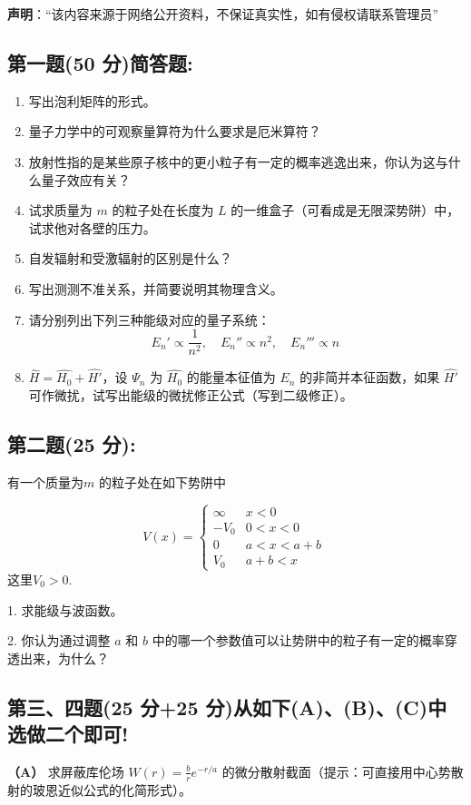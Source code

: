 
\textbf{声明}：“该内容来源于网络公开资料，不保证真实性，如有侵权请联系管理员”

\subsection{第一题(50 分)简答题:}
\begin{enumerate}
  \item 写出泡利矩阵的形式。
  \item 量子力学中的可观察量算符为什么要求是厄米算符？
  \item 放射性指的是某些原子核中的更小粒子有一定的概率逃逸出来，你认为这与什么量子效应有关？
  \item 试求质量为 $m$ 的粒子处在长度为 $L$ 的一维盒子（可看成是无限深势阱）中，试求他对各壁的压力。
  \item 自发辐射和受激辐射的区别是什么？
  \item 写出测测不准关系，并简要说明其物理含义。
  \item 请分别列出下列三种能级对应的量子系统：
  \[    E_n' \propto \frac{1}{n^2}, \quad E_n'' \propto n^2, \quad E_n''' \propto n ~\]
  \item $\hat{H} = \hat{H_0} + \hat{H'}$，设 $\Psi_n$ 为 $\hat{H_0}$ 的能量本征值为 $E_n$ 的非简并本征函数，如果 $\hat{H'}$ 可作微扰，试写出能级的微扰修正公式（写到二级修正）。
\end{enumerate}
\subsection{第二题(25 分):}
有一个质量为$m$ 的粒子处在如下势阱中

\[
V(x) =
\begin{cases} 
    \infty & x < 0 \\
    -V_0 & 0 < x < 0 \\
    0 & a < x < a + b \\
    V_0 &  a + b < x
\end{cases}~
\]
这里\( V_0 > 0 \).

1. 求能级与波函数。

2. 你认为通过调整 \( a \) 和 \( b \) 中的哪一个参数值可以让势阱中的粒子有一定的概率穿透出来，为什么？
\subsection{第三、四题(25 分+25 分)从如下(A)、(B)、(C)中选做二个即可!}
\textbf{（A）} 求屏蔽库伦场 $W(r) = \frac{b}{r} e^{-r/a}$ 的微分散射截面（提示：可直接用中心势散射的玻恩近似公式的化简形式）。


